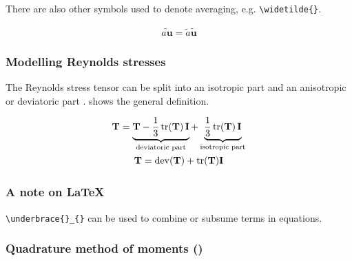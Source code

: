 There are also other symbols used to denote averaging, e.g. \verb+\widetilde{}+.

\begin{gather}
	\widetilde{a \mathbf{u}} = \widetilde{a} \widetilde{\mathbf{u}}
\end{gather}





\subsubsection{Modelling Reynolds stresses}

The Reynolds stress tensor can be split into an isotropic part and an anisotropic or 
deviatoric part \cite{pope2000}.  shows the general definition.

\begin{gather}
	\mathbf{T} = \underbrace{\mathbf{T} - \frac{1}{3} \operatorname{tr}(\mathbf{T}) \,\mathbf{I}}_{\text{deviatoric part}}
		+ \underbrace{\frac{1}{3} \operatorname{tr}(\mathbf{T}) \,\mathbf{I}}_{\text{isotropic part}} 
		\label{eq:tensorDeviatorDecomposition}\\
	\mathbf{T} = \operatorname{dev}(\mathbf{T}) + \operatorname{tr}(\mathbf{T}) \mathbf{I}
\end{gather}


\subsubsection*{A note on \LaTeX{}}

\verb+\underbrace{}_{}+ can be used to combine or subsume terms in equations.









\subsubsection{Quadrature method of moments  ()}

